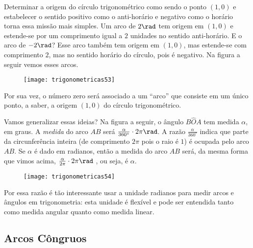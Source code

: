 Determinar a origem do círculo trigonométrico como sendo o ponto $(1,0)$ e estabelecer o sentido positivo como o anti-horário e negativo como o horário torna essa missão mais simples. Um arco de $2\rad$ tem origem em $(1,0)$ e estende-se por um comprimento igual a $2$ unidades no sentido anti-horário. E o arco de $-2 \rad$? Esse arco também tem origem em $(1,0)$, mas estende-se com comprimento $2$, mas no sentido horário do círculo, pois é negativo. Na figura a seguir vemos esses arcos.

\begin{figure}[H]
\centering

\texttt{[image: trigonometricas53]}
\end{figure}

Por sua vez, o número zero será associado a um “arco”{} que consiste em um único ponto, a saber, a origem $(1,0)$ do círculo trigonométrico.

Vamos generalizar essas ideias? Na figura a seguir, o ângulo ${B\hat{O}A}$ tem medida $\alpha$, em graus. A \textit{medida} do arco $AB$ será  $\frac{\alpha}{360^{\circ}}\cdot2\pi\rad$. A razão $\frac{\alpha}{360^{\circ}}$ indica que parte da circunferência inteira (de comprimento $2\pi$ pois o raio é $1$) é ocupada pelo arco $AB$. Se $\alpha$ é dado em radianos, então a medida do arco $AB$ será, da mesma forma que vimos acima, $\frac{\alpha}{2\pi}\cdot2\pi\rad$ , ou seja, é $\alpha$.

\begin{figure}[H]
\centering

\texttt{[image: trigonometricas54]}
\end{figure}

Por essa razão é tão interessante usar a unidade radianos para medir arcos e ângulos em trigonometria: esta unidade é flexível e pode ser entendida tanto como medida angular quanto como medida linear.

\subsection{Arcos Côngruos}

